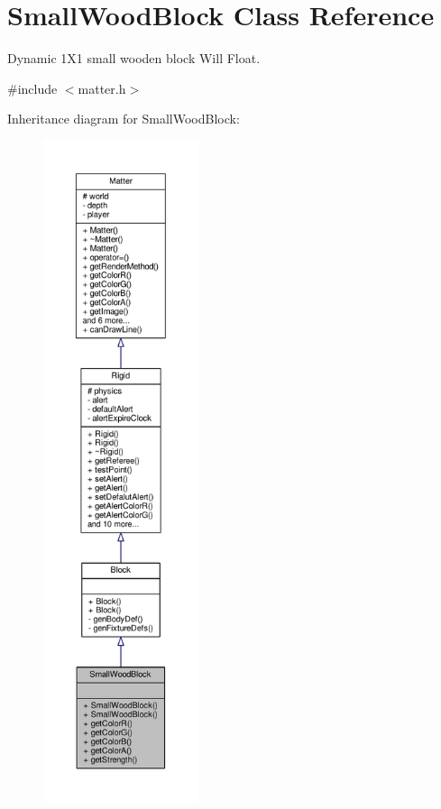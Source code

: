 \hypertarget{classSmallWoodBlock}{}\section{Small\+Wood\+Block Class Reference}
\label{classSmallWoodBlock}


Dynamic 1\+X1 small wooden block Will Float.  




{\ttfamily \#include $<$matter.\+h$>$}



Inheritance diagram for Small\+Wood\+Block\+:
\nopagebreak
\begin{figure}[H]
\begin{center}
\leavevmode
\includegraphics[height=550pt]{classSmallWoodBlock__inherit__graph}
\end{center}
\end{figure}


